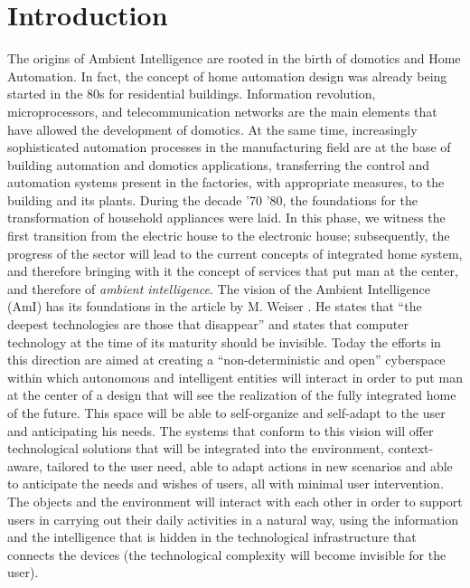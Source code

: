 \chapter{Introduction}\label{ch:intro}

The origins of Ambient Intelligence are rooted in the birth of domotics and Home Automation. In fact, the concept of home automation design was already being started in the 80s for residential buildings. Information revolution, microprocessors, and telecommunication networks are the main elements that have allowed the development of domotics. At the same time, increasingly sophisticated automation processes in the manufacturing field are at the base of building automation and domotics applications, transferring the control and automation systems present in the factories, with appropriate measures, to the building and its plants. During the decade '70 '80, the foundations for the transformation of household appliances were laid. In this phase, we witness the first transition from the electric house to the electronic house; subsequently, the progress of the sector will lead to the current concepts of integrated home system, and therefore bringing with it the concept of services that put man at the center, and therefore of \textit{ambient intelligence}. The vision of the Ambient Intelligence (AmI) \cite{ducatel2001scenarios} has its foundations in the article by M. Weiser \cite{weiser1991}. He states that ``the deepest technologies are those that disappear'' and states that computer technology at the time of its maturity should be invisible.
Today the efforts in this direction are aimed at creating a ``non-deterministic and open'' cyberspace within which autonomous and intelligent entities will interact in order to put man at the center of a design that will see the realization of the fully integrated home of the future. This space will be able to self-organize and self-adapt to the user and anticipating his needs. The systems that conform to this vision will offer technological solutions that will be integrated into the environment, context-aware, tailored to the user need, able to adapt actions in new scenarios and able to anticipate the needs and wishes of users, all with minimal user intervention. 
The objects and the environment will interact with each other in order to support users in carrying out their daily activities in a natural way, using the information and the intelligence that is hidden in the technological infrastructure that connects the devices (the technological complexity will become invisible for the user).
